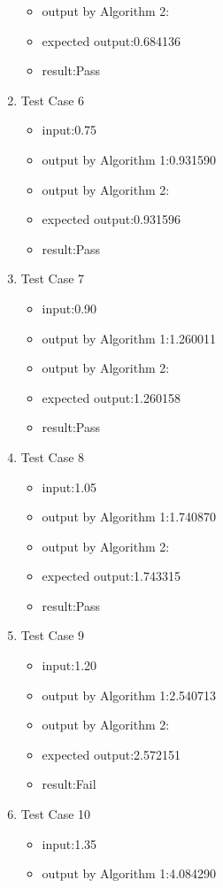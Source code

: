 \documentclass[10pt,a4paper,twoside]{article}
\begin{document}
\begin{enumerate}
\begin{itemize}
    \item output by Algorithm 2:
    \item expected output:0.684136
    \item result:Pass
\end{itemize}
\item 
Test Case 6
\begin{itemize}
    \item input:0.75
    \item output by Algorithm 1:0.931590
    \item output by Algorithm 2:
    \item expected output:0.931596
    \item result:Pass
\end{itemize}
\item 
Test Case 7
\begin{itemize}
    \item input:0.90
    \item output by Algorithm 1:1.260011
    \item output by Algorithm 2:
    \item expected output:1.260158
    \item result:Pass
\end{itemize}
\item 
Test Case 8
\begin{itemize}
    \item input:1.05
    \item output by Algorithm 1:1.740870
    \item output by Algorithm 2:
    \item expected output:1.743315
    \item result:Pass
\end{itemize}
\item 
Test Case 9
\begin{itemize}
    \item input:1.20
    \item output by Algorithm 1:2.540713
    \item output by Algorithm 2:
    \item expected output:2.572151
    \item result:Fail
\end{itemize}
\item 
Test Case 10
\begin{itemize}
    \item input:1.35
    \item output by Algorithm 1:4.084290

\end{itemize}
\end{enumerate}
\end{document}
